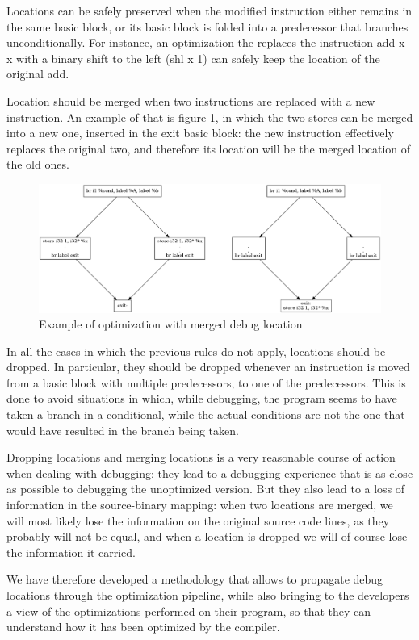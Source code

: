 Locations can be safely preserved when the modified instruction either remains in the same basic block, or its basic block is folded into a predecessor that branches unconditionally. For instance, an optimization the replaces the instruction {\selectfont add x x} with a binary shift to the left ({\selectfont shl x 1}) can safely keep the location of the original add. \par 
Location should be merged when two instructions are replaced with a new instruction. An example of that is figure \ref{fig:merge}, in which the two stores can be merged into a new one, inserted in the exit basic block: the new instruction effectively replaces the original two, and therefore its location will be the merged location of the old ones. \par

\begin{figure}
\centering
\includegraphics[scale=0.3]{chapter-1/merge.png}
\caption{Example of optimization with merged debug location}
\label{fig:merge}
\end{figure}

In all the cases in which the previous rules do not apply, locations should be dropped. In particular, they should be dropped whenever an instruction is moved from a basic block with multiple predecessors, to one of the predecessors. This is done to avoid situations in which, while debugging, the program seems to have taken a branch in a conditional, while the actual conditions are not the one that would have resulted in the branch being taken. \par 
Dropping locations and merging locations is a very reasonable course of action when dealing with debugging: they lead to a debugging experience that is as close as possible to debugging the unoptimized version. But they also lead to a loss of information in the source-binary mapping: when two locations are merged, we will most likely lose the information on the original source code lines, as they probably will not be equal, and when a location is dropped we will of course lose the information it carried.\par
We have therefore developed a methodology that allows to propagate debug locations through the optimization pipeline, while also bringing to the developers a view of the optimizations performed on their program, so that they can understand how it has been optimized by the compiler.

